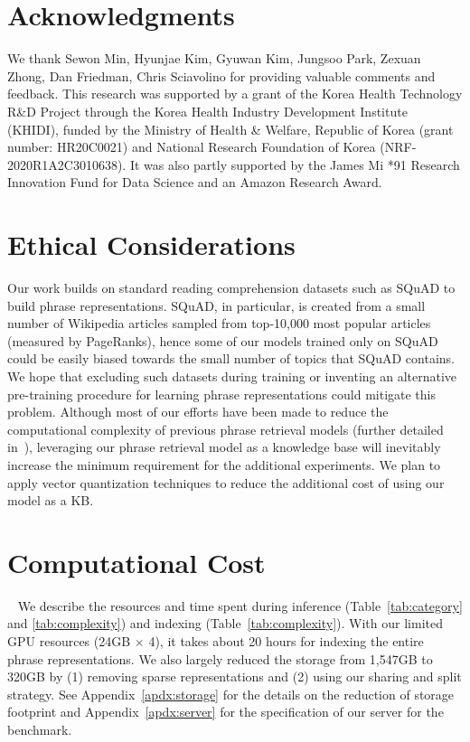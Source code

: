 \documentclass[11pt,a4paper]{article}
\begin{document}
\vspace{1em}
\section*{Acknowledgments}
We thank Sewon Min, Hyunjae Kim, Gyuwan Kim, Jungsoo Park, Zexuan Zhong, Dan Friedman, Chris Sciavolino for providing valuable comments and feedback.
This research was supported by a grant of the Korea Health Technology R\&D Project through the Korea Health Industry Development Institute (KHIDI), funded by the Ministry of Health \& Welfare, Republic of Korea (grant number: HR20C0021) and National Research Foundation of Korea (NRF-2020R1A2C3010638).
It was also partly supported by the James Mi *91 Research Innovation Fund for Data Science and an Amazon Research Award.
\clearpage

\section*{Ethical Considerations}\label{sec:ethics}
Our work builds on standard reading comprehension datasets such as SQuAD to build phrase representations.
SQuAD, in particular, is created from a small number of Wikipedia articles sampled from top-10,000 most popular articles (measured by PageRanks), hence some of our models trained only on SQuAD could be easily biased towards the small number of topics that SQuAD contains.
We hope that excluding such datasets during training or inventing an alternative pre-training procedure for learning phrase representations could mitigate this problem.
Although most of our efforts have been made to reduce the computational complexity of previous phrase retrieval models (further detailed in~), leveraging our phrase retrieval model as a knowledge base will inevitably increase the minimum requirement for the additional experiments. We plan to apply vector quantization techniques to reduce the additional cost of using our model as a KB.
 





\clearpage
\appendix
\setcounter{table}{0}
\renewcommand{\thetable}{\Alph{section}.\arabic{table}}

\section{Computational Cost}~\label{apdx:complexity}
We describe the resources and time spent during inference (Table~\ref{tab:category} and \ref{tab:complexity}) and indexing (Table~\ref{tab:complexity}).
With our limited GPU resources (24GB $\times$ 4), it takes about 20 hours for indexing the entire phrase representations.
We also largely reduced the storage from 1,547GB to 320GB by (1) removing sparse representations and (2) using our sharing and split strategy.
See Appendix~\ref{apdx:storage} for the details on the reduction of storage footprint and Appendix~\ref{apdx:server} for the specification of our server for the benchmark.
\end{document}
